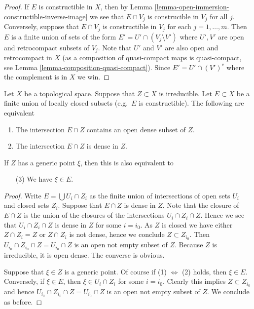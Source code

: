 \begin{proof}
If $E$ is constructible in $X$, then by
Lemma \ref{lemma-open-immersion-constructible-inverse-image}
we see that $E \cap V_j$ is construcible in $V_j$ for all $j$.
Conversely, suppose that $E \cap V_j$
is constructible in $V_j$ for each $j = 1, \ldots, m$.
Then $E$ is a finite union of sets of the form
$E' = U' \cap (V_j \setminus V')$ where $U', V'$ are
open and retrocompact subsets of $V_j$. Note that $U'$ and $V'$ are also
open and retrocompact in $X$ (as a composition of quasi-compact
maps is quasi-compact, see
Lemma \ref{lemma-composition-quasi-compact}).
Since $E' = U' \cap (V')^c$ where the complement is in $X$ we win.
\end{proof}

\begin{lemma}
\label{lemma-generic-point-in-constructible}
Let $X$ be a topological space. Suppose that
$Z \subset X$ is irreducible. Let $E \subset X$
be a finite union of locally closed subsets (e.g.\ $E$
is constructible). The following are equivalent
\begin{enumerate}
\item The intersection $E \cap Z$ contains an open
dense subset of $Z$.
\item The intersection $E \cap Z$ is dense in $Z$.
\end{enumerate}
If $Z$ has a generic point $\xi$, then this is
also equivalent to
\begin{enumerate}
\item[(3)] We have $\xi \in E$.
\end{enumerate}
\end{lemma}

\begin{proof}
Write $E = \bigcup U_i \cap Z_i$ as the finite union of
intersections of open sets $U_i$ and closed sets $Z_i$.
Suppose that $E \cap Z$ is dense in $Z$. Note that
the closure of $E \cap Z$ is the union of the closures
of the intersections $U_i \cap Z_i \cap Z$. Hence we
see that $U_i \cap Z_i \cap Z$ is dense in $Z$ for some $i = i_0$.
As $Z$ is closed we have either $Z \cap Z_i = Z$ or
$Z \cap Z_i$ is not dense, hence we conclude $Z \subset Z_{i_0}$.
Then $U_{i_0} \cap Z_{i_0} \cap Z = U_{i_0} \cap Z$ is an open
not empty subset of $Z$. Because $Z$ is irreducible, it is open dense.
The converse is obvious.

\medskip\noindent
Suppose that $\xi \in Z$ is a generic point. Of course if
(1) $\Leftrightarrow$ (2) holds, then $\xi \in E$. Conversely,
if $\xi \in E$, then $\xi \in U_i \cap Z_i$ for some $i = i_0$.
Clearly this implies $Z \subset Z_{i_0}$ and hence
$U_{i_0} \cap Z_{i_0} \cap Z = U_{i_0} \cap Z$ is an open
not empty subset of $Z$. We conclude as before.
\end{proof}







